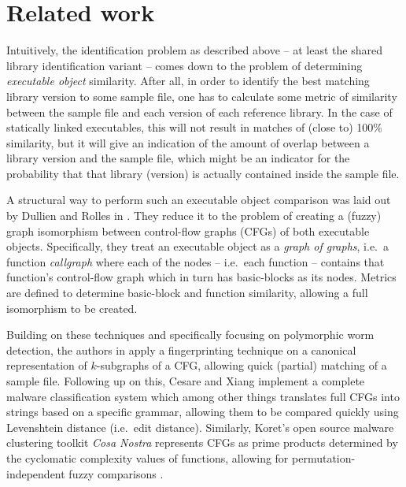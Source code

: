 \documentclass[twocolumn,a4paper]{IEEEtran} %
\begin{document}
\section{Related work}
\label{sec:relwork}

Intuitively, the identification problem as described above -- at least the shared library identification variant -- comes down to the problem of determining \emph{executable object} similarity. After all, in order to identify the best matching library version to some sample file, one has to calculate some metric of similarity between the sample file and each version of each reference library. In the case of statically linked executables, this will not result in matches of (close to) 100\% similarity, but it will give an indication of the amount of overlap between a library version and the sample file, which might be an indicator for the probability that that library (version) is actually contained inside the sample file.

A structural way to perform such an executable object comparison was laid out by Dullien and Rolles in \cite{dullien2005graph}. They reduce it to the problem of creating a (fuzzy) graph isomorphism between control-flow graphs (CFGs) of both executable objects. Specifically, they treat an executable object as a \emph{graph of graphs}, i.e.~a function \emph{callgraph} where each of the nodes -- i.e.~each function -- contains that function's control-flow graph which in turn has basic-blocks as its nodes. Metrics are defined to determine basic-block and function similarity, allowing a full isomorphism to be created.

Building on these techniques and specifically focusing on polymorphic worm detection, the authors in \cite{Kruegel2006} apply a fingerprinting technique on a canonical representation of $k$-subgraphs of a CFG, allowing quick (partial) matching of a sample file. Following up on this, Cesare and Xiang \cite{Cesare2011} implement a complete malware classification system which among other things translates full CFGs into strings based on a specific grammar, allowing them to be compared quickly using Levenshtein distance (i.e.~edit distance). Similarly, Koret's open source malware clustering toolkit \emph{Cosa Nostra} represents CFGs as prime products determined by the cyclomatic complexity values of functions, allowing for permutation-independent fuzzy comparisons \cite{Koret2016}.
\end{document}
